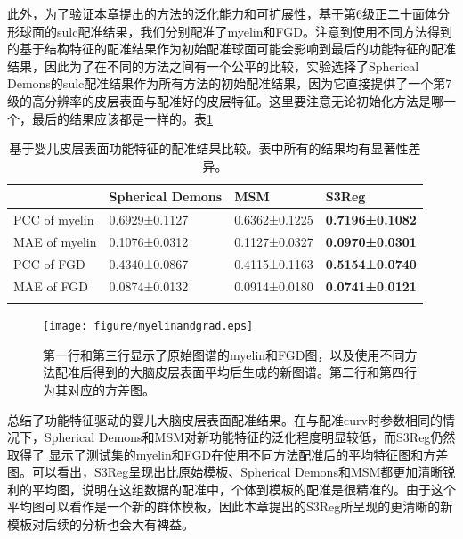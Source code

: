 此外，为了验证本章提出的方法的泛化能力和可扩展性，基于第6级正二十面体分形球面的sulc配准结果，我们分别配准了myelin和FGD。注意到使用不同方法得到的基于结构特征的配准结果作为初始配准球面可能会影响到最后的功能特征的配准结果，因此为了在不同的方法之间有一个公平的比较，实验选择了Spherical Demons的sulc配准结果作为所有方法的初始配准结果，因为它直接提供了一个第7级的高分辨率的皮层表面与配准好的皮层特征。这里要注意无论初始化方法是哪一个，最后的结果应该都是一样的。表\ref{tab:婴儿皮层表面功能特征配准结果}
\begin{table}[h]
		\caption{基于婴儿皮层表面功能特征的配准结果比较。表中所有的结果均有显著性差异。}
		\label{tab:婴儿皮层表面功能特征配准结果}
		\centering
		\begin{tabularx}{0.9\columnwidth}{X<{\centering} X<{\centering} X<{\centering} X<{\centering}}
			\Xhline{2\arrayrulewidth}
			& Spherical Demons &	MSM	& S3Reg  \\
		    \hline
			PCC of myelin              &	0.6929±0.1127	 &  0.6362±0.1225 &	\textbf{0.7196±0.1082} \\
			MAE of myelin              &	0.1076±0.0312    &	0.1127±0.0327 &	\textbf{0.0970±0.0301} \\
			PCC of FGD    &	0.4340±0.0867    &	0.4115±0.1163 &	\textbf{0.5154±0.0740} \\
			MAE of FGD	   &    0.0874±0.0132    &	0.0914±0.0180 &	\textbf{0.0741±0.0121} \\	
			\Xhline{2\arrayrulewidth}
		\end{tabularx}
\end{table}
\begin{figure}[h]
	\centering
	\texttt{[image: figure/myelinandgrad.eps]}
	\caption{第一行和第三行显示了原始图谱的myelin和FGD图，以及使用不同方法配准后得到的大脑皮层表面平均后生成的新图谱。第二行和第四行为其对应的方差图。}
	\label{fig:myelinandgrad}
\end{figure}
总结了功能特征驱动的婴儿大脑皮层表面配准结果。在与配准curv时参数相同的情况下，Spherical Demons和MSM对新功能特征的泛化程度明显较低，而S3Reg仍然取得了
显示了测试集的myelin和FGD在使用不同方法配准后的平均特征图和方差图。可以看出，S3Reg呈现出比原始模板、Spherical Demons和MSM都更加清晰锐利的平均图，说明在这组数据的配准中，个体到模板的配准是很精准的。由于这个平均图可以看作是一个新的群体模板，因此本章提出的S3Reg所呈现的更清晰的新模板对后续的分析也会大有裨益。


